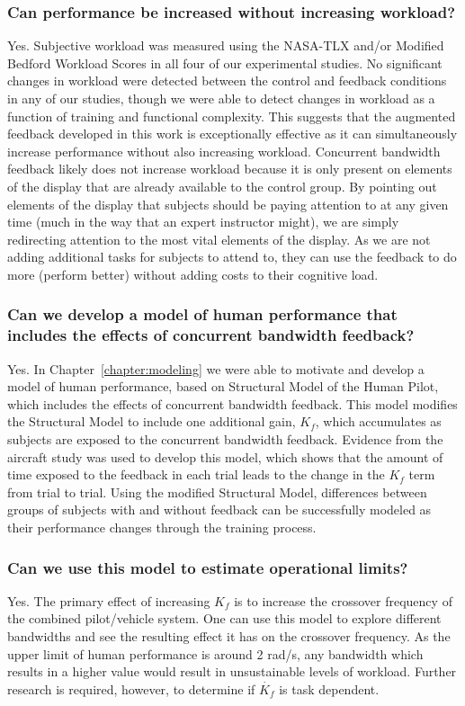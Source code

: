 \subsubsection{Can performance be increased without increasing workload?}
Yes.
Subjective workload was measured using the NASA-TLX and/or Modified Bedford Workload Scores in all four of our experimental studies.
No significant changes in workload were detected between the control and feedback conditions in any of our studies, though we were able to detect changes in workload as a function of training and functional complexity.
This suggests that the augmented feedback developed in this work is exceptionally effective as it can simultaneously increase performance without also increasing workload.
Concurrent bandwidth feedback likely does not increase workload because it is only present on elements of the display that are already available to the control group.
By pointing out elements of the display that subjects should be paying attention to at any given time (much in the way that an expert instructor might), we are simply redirecting attention to the most vital elements of the display.
As we are not adding additional tasks for subjects to attend to, they can use the feedback to do more (perform better) without adding costs to their cognitive load.

\subsubsection{Can we develop a model of human performance that includes the effects of concurrent bandwidth feedback?}
Yes.
In Chapter~\ref{chapter:modeling} we were able to motivate and develop a model of human performance, based on Structural Model of the Human Pilot, which includes the effects of concurrent bandwidth feedback.
This model modifies the Structural Model to include one additional gain, $K_f$, which accumulates as subjects are exposed to the concurrent bandwidth feedback.
Evidence from the aircraft study was used to develop this model, which shows that the amount of time exposed to the feedback in each trial leads to the change in the $K_f$ term from trial to trial.
Using the modified Structural Model, differences between groups of subjects with and without feedback can be successfully modeled as their performance changes through the training process.

\subsubsection{Can we use this model to estimate operational limits?}
Yes.
The primary effect of increasing $K_f$ is to increase the crossover frequency of the combined pilot/vehicle system.
One can use this model to explore different bandwidths and see the resulting effect it has on the crossover frequency.
As the upper limit of human performance is around 2 rad/s, any bandwidth which results in a higher value would result in unsustainable levels of workload.
Further research is required, however, to determine if $\dot{K_f}$ is task dependent.

